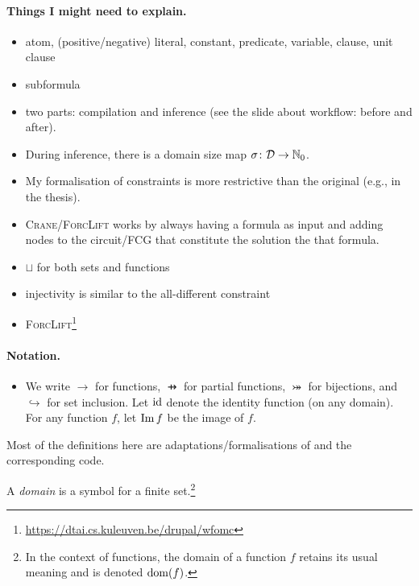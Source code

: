 \paragraph{Things I might need to explain.}
\begin{itemize}
  \item atom, (positive/negative) literal, constant, predicate, variable,
        clause, unit clause
  \item subformula
  \item two parts: compilation and inference (see the slide about workflow:
        before and after).
  \item During inference, there is a domain size map
        $\operatorname{\sigma}\colon \mathcal{D} \to \mathbb{N}_0$.
  \item My formalisation of constraints is more restrictive than the original
        (e.g., in the thesis).
  \item \textsc{Crane/ForcLift} works by always having a formula as input and
        adding nodes to the circuit/FCG that constitute the solution the that
        formula.
  \item $\sqcup$ for both sets and functions
  \item injectivity is similar to the all-different constraint
  \item \textsc{ForcLift}\footnote{\url{https://dtai.cs.kuleuven.be/drupal/wfomc}}
\end{itemize}

\paragraph{Notation.}
\begin{itemize}
  \item We write $\to$ for functions, $\pfun$ for partial functions,
        $\twoheadrightarrowtail$ for bijections, and $\hookrightarrow$ for set
        inclusion. Let $\operatorname{id}$ denote the identity function (on any domain). For
        any function $f$, let $\operatorname{Im} f$ be the image of $f$.
\end{itemize}

Most of the definitions here are adaptations/formalisations of
\citep{DBLP:conf/ijcai/BroeckTMDR11} and the corresponding code.

\begin{definition}
  A \emph{domain} is a symbol for a finite set.\footnote{In the context of
    functions, the domain of a function $f$ retains its usual meaning and is
    denoted $\operatorname{dom}(f)$.}
\end{definition}

